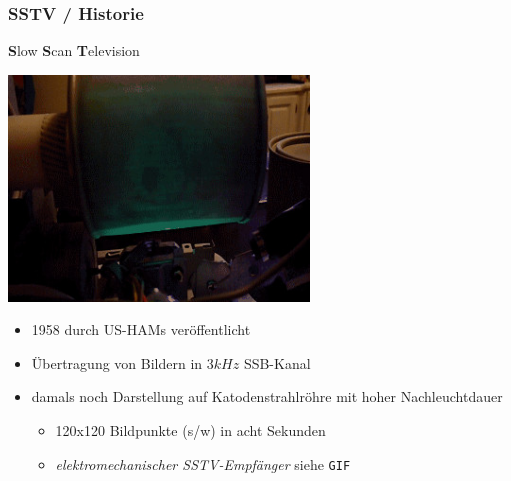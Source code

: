 \begin{frame}
    \frametitle{SSTV / Historie}

    \textbf{S}low \textbf{S}can \textbf{T}elevision

    \begin{center}
        \includegraphics[width=0.6\textwidth]{e16/Mechanical_glow_drum_slow_scan_television_monitor.jpg}
        \tiny \hyperlink{refs}{\cite{wc}}
    \end{center}

    \begin{itemize}
        \item 1958 durch US-HAMs veröffentlicht
        \item Übertragung von Bildern in $3 kHz$ SSB-Kanal
        \item damals noch Darstellung auf Katodenstrahlröhre mit hoher Nachleuchtdauer
        \begin{itemize}
            \item 120x120 Bildpunkte (s/w) in acht Sekunden
            \item \emph{elektromechanischer SSTV-Empfänger} siehe \texttt{GIF}
        \end{itemize}
    \end{itemize}

\end{frame}


